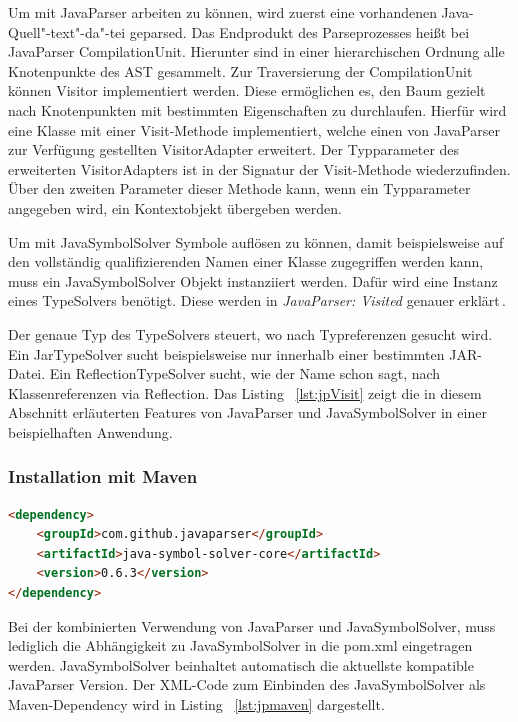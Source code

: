 \documentclass[12pt,oneside,a4paper,parskip]{scrbook}
\begin{document}
Um mit JavaParser arbeiten zu können, wird zuerst eine vorhandenen Java-Quell"-text"-da"-tei geparsed. Das Endprodukt des Parseprozesses heißt bei JavaParser CompilationUnit. Hierunter sind in einer hierarchischen Ordnung alle Knotenpunkte des AST gesammelt. Zur Traversierung der CompilationUnit können Visitor implementiert werden. Diese ermöglichen es, den Baum gezielt nach Knotenpunkten mit bestimmten Eigenschaften zu durchlaufen. Hierfür wird eine Klasse mit einer Visit-Methode implementiert, welche einen von JavaParser zur Verfügung gestellten VisitorAdapter erweitert. Der Typparameter des erweiterten VisitorAdapters ist in der Signatur der Visit-Methode wiederzufinden. Über den zweiten Parameter dieser Methode kann, wenn ein Typparameter angegeben wird, ein Kontextobjekt übergeben werden.

Um mit JavaSymbolSolver Symbole auflösen zu können, damit beispielsweise auf den vollständig qualifizierenden Namen einer Klasse zugegriffen werden kann, muss ein JavaSymbolSolver Objekt instanziiert werden. Dafür wird eine Instanz eines TypeSolvers benötigt. Diese werden in \textit{JavaParser: Visited} genauer erklärt\,\cite[S.\,39ff.]{javaparser2017}.

Der genaue Typ des TypeSolvers steuert, wo nach Typreferenzen gesucht wird. Ein JarTypeSolver sucht beispielsweise nur innerhalb einer bestimmten JAR-Datei. Ein ReflectionTypeSolver sucht, wie der Name schon sagt, nach Klassenreferenzen via Reflection. Das Listing ~\ref{lst:jpVisit} zeigt die in diesem Abschnitt erläuterten Features von JavaParser und JavaSymbolSolver in einer beispielhaften Anwendung.

\subsubsection{Installation mit Maven}

\begin{lstlisting}[label=lst:jpmaven,
language=HTML,
firstnumber=1,
caption=XML-Code zum Einbinden von JavaParser und JavaSymbolSolver als Maven-Dependency.]
<dependency>
	<groupId>com.github.javaparser</groupId>
	<artifactId>java-symbol-solver-core</artifactId>
	<version>0.6.3</version>
</dependency>
\end{lstlisting}

Bei der kombinierten Verwendung von JavaParser und JavaSymbolSolver, muss lediglich die Abhängigkeit zu JavaSymbolSolver in die pom.xml eingetragen werden. JavaSymbolSolver beinhaltet automatisch die aktuellste kompatible JavaParser Version. Der XML-Code zum Einbinden des JavaSymbolSolver als Maven-Dependency wird in Listing ~\ref{lst:jpmaven} dargestellt.
\end{document}
